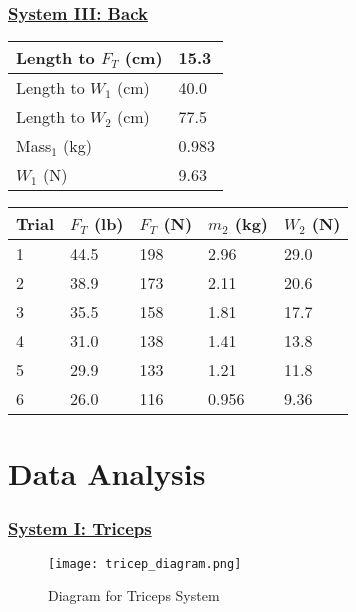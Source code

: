 \documentclass[fleqn]{article}
\begin{document}
\subsubsection*{\underline{System III: Back}}
\begin{table}[H]
	\setlength{\extrarowheight}{2pt}
	\centering
	\begin{tabularx}{\textwidth}{|X|X|}
		\hline
		Length to $F_T$ (cm) & 15.3  \\ \hline
		Length to $W_1$ (cm) & 40.0  \\ \hline
		Length to $W_2$ (cm) & 77.5  \\ \hline
		Mass$_{1}$ (kg)      & 0.983 \\ \hline
		$W_1$ (N)            & 9.63  \\ \hline
	\end{tabularx}
\end{table}

\begin{table}[H]
	\setlength{\extrarowheight}{2pt}
	\centering
	\begin{tabularx}{\textwidth}{|X|X|X|X|X|}
		\rowcolor{gray!50}
		\hline
		Trial & $F_T$ (lb) & $F_T$ (N) & $m_2$ (kg) & $W_2$ (N) \\ \hline
		1     & 44.5       & 198       & 2.96       & 29.0      \\ \hline
		2     & 38.9       & 173       & 2.11       & 20.6      \\ \hline
		3     & 35.5       & 158       & 1.81       & 17.7      \\ \hline
		4     & 31.0       & 138       & 1.41       & 13.8      \\ \hline
		5     & 29.9       & 133       & 1.21       & 11.8      \\ \hline
		6     & 26.0       & 116       & 0.956      & 9.36      \\ \hline
	\end{tabularx}
\end{table}

\section*{Data Analysis}
\subsubsection*{\underline{System I: Triceps}}
\begin{figure}[H]
	\caption*{Diagram for Triceps System}
	\centering
	\texttt{[image: tricep\_diagram.png]}
\end{figure}
\end{document}
